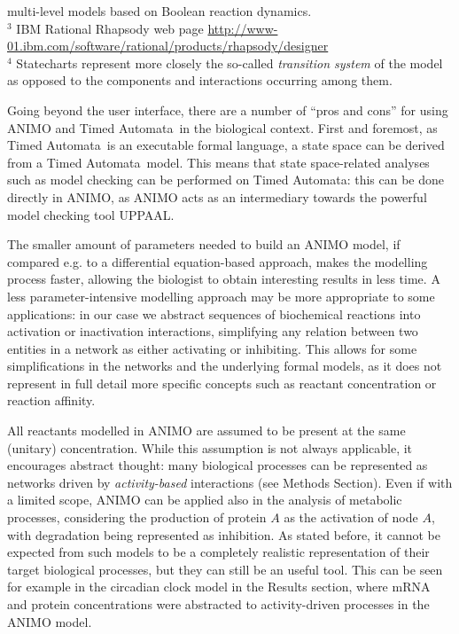 \documentclass{bmcart}
\def\tas{Timed Automata}
\begin{document}
\begin{table}[!hbt]
{multi-level models based on Boolean reaction dynamics.\\
$^3$ {IBM Rational Rhapsody} web page \protect\url{http://www-01.ibm.com/software/rational/products/rhapsody/designer}\\
$^4$ Statecharts represent more closely the so-called \protect\emph{transition system} of the model as opposed to the components and interactions occurring among them.
\label{tab:tool-comparison}}
\end{table}

Going beyond the user interface, there are a number of ``pros and cons'' for using ANIMO and \tas\
in the biological context. First and foremost, as \tas\ is an executable formal language,
a state space can be derived from a \tas\ model. This means that state space-related analyses
such as model checking can be performed on \tas: this can
be done directly in ANIMO, as
ANIMO acts as an intermediary towards the powerful model checking tool UPPAAL.

The smaller amount of parameters needed to build an ANIMO model, if compared e.g. to
a differential equation-based approach, makes the modelling process faster, allowing
the biologist to obtain interesting results in less time. A less
parameter-intensive modelling approach may be more appropriate to some applications:
in our case we abstract
sequences of biochemical reactions into activation or inactivation interactions,
simplifying any relation between two entities in a network as either activating or
inhibiting. This allows for some simplifications in the networks and the underlying
formal models, as it does not represent in full detail more specific concepts
such as reactant concentration or reaction affinity.

All reactants modelled in ANIMO are assumed to be present at the same
(unitary) concentration. While this assumption is not always applicable, it encourages
abstract thought: many biological processes can be represented as networks driven by
\emph{activity-based} interactions (see Methods Section). Even if with a limited scope, ANIMO can be applied
also in the analysis of metabolic processes, considering the production of protein $A$ as
the activation of node $A$, with degradation being represented as inhibition. As stated before,
it cannot be expected from such models to be a completely realistic representation of their target biological
processes, but they can still be an useful tool. This can be seen for example in the circadian clock
model in the Results section, where mRNA and protein concentrations were abstracted to
activity-driven processes in the ANIMO model.
\end{document}
